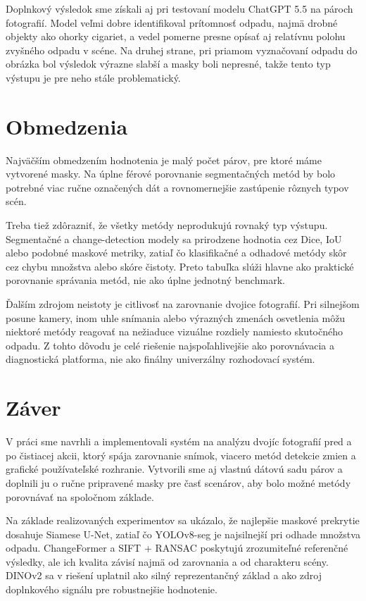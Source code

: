 \documentclass[conference]{IEEEtran}
\begin{document}
Doplnkový výsledok sme získali aj pri testovaní modelu ChatGPT 5.5 na pároch fotografií. Model veľmi dobre identifikoval prítomnosť odpadu, najmä drobné objekty ako ohorky cigariet, a vedel pomerne presne opísať aj relatívnu polohu zvyšného odpadu v scéne. Na druhej strane, pri priamom vyznačovaní odpadu do obrázka bol výsledok výrazne slabší a masky boli nepresné, takže tento typ výstupu je pre neho stále problematický.

\section{Obmedzenia}
Najväčším obmedzením hodnotenia je malý počet párov, pre ktoré máme vytvorené masky. Na úplne férové porovnanie segmentačných metód by bolo potrebné viac ručne označených dát a rovnomernejšie zastúpenie rôznych typov scén.

Treba tiež zdôrazniť, že všetky metódy neprodukujú rovnaký typ výstupu. Segmentačné a change-detection modely sa prirodzene hodnotia cez Dice, IoU alebo podobné maskové metriky, zatiaľ čo klasifikačné a odhadové metódy skôr cez chybu množstva alebo skóre čistoty. Preto tabuľka slúži hlavne ako praktické porovnanie správania metód, nie ako úplne jednotný benchmark. 

Ďalším zdrojom neistoty je citlivosť na zarovnanie dvojice fotografií. Pri silnejšom posune kamery, inom uhle snímania alebo výrazných zmenách osvetlenia môžu niektoré metódy reagovať na nežiaduce vizuálne rozdiely namiesto skutočného odpadu. Z tohto dôvodu je celé riešenie najspoľahlivejšie ako porovnávacia a diagnostická platforma, nie ako finálny univerzálny rozhodovací systém.

\section{Záver}
V práci sme navrhli a implementovali systém na analýzu dvojíc fotografií pred a po čistiacej akcii, ktorý spája zarovnanie snímok, viacero metód detekcie zmien a grafické používateľské rozhranie. Vytvorili sme aj vlastnú dátovú sadu párov a doplnili ju o ručne pripravené masky pre časť scenárov, aby bolo možné metódy porovnávať na spoločnom základe.

Na základe realizovaných experimentov sa ukázalo, že najlepšie maskové prekrytie dosahuje Siamese U-Net, zatiaľ čo YOLOv8-seg je najsilnejší pri odhade množstva odpadu. ChangeFormer a SIFT + RANSAC poskytujú zrozumiteľné referenčné výsledky, ale ich kvalita závisí najmä od zarovnania a od charakteru scény. DINOv2 sa v riešení uplatnil ako silný reprezentančný základ a ako zdroj doplnkového signálu pre robustnejšie hodnotenie.
\end{document}
